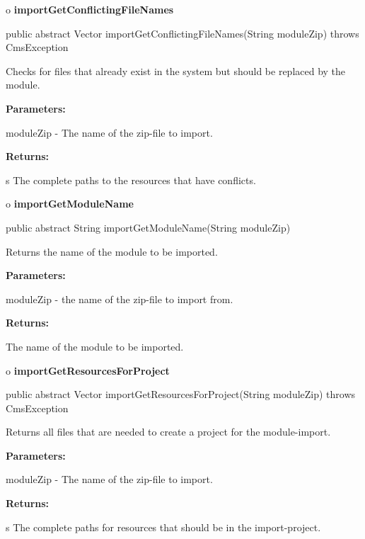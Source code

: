 o {\bf importGetConflictingFileNames} 

\begin{PRE}
 public abstract Vector importGetConflictingFileNames(String moduleZip) throws CmsException
\end{PRE}

\begin{description}
\htmlDD Checks for files that already exist in the system but should be
replaced by the module. 

\begin{description}
\item {\bf Parameters:}  

moduleZip - The name of the zip-file to import.  
\item {\bf Returns:}  

s The complete paths to the resources that have conflicts.  
\end{description}

\end{description}

o {\bf importGetModuleName} 

\begin{PRE}
 public abstract String importGetModuleName(String moduleZip)
\end{PRE}

\begin{description}
\htmlDD Returns the name of the module to be imported. 

\begin{description}
\item {\bf Parameters:}  

moduleZip - the name of the zip-file to import from.  
\item {\bf Returns:}  

The name of the module to be imported.  
\end{description}

\end{description}

o {\bf importGetResourcesForProject} 

\begin{PRE}
 public abstract Vector importGetResourcesForProject(String moduleZip) throws CmsException
\end{PRE}

\begin{description}
\htmlDD Returns all files that are needed to create a project for the
module-import. 

\begin{description}
\item {\bf Parameters:}  

moduleZip - The name of the zip-file to import.  
\item {\bf Returns:}  

s The complete paths for resources that should be in the import-project.  
\end{description}

\end{description}

